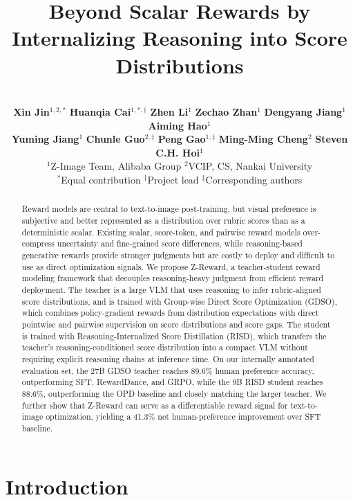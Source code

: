 \documentclass{article}
\title{
Beyond Scalar Rewards by\\Internalizing Reasoning into Score Distributions
}
\author{
\vspace{-39pt}\\
\hspace{-6mm} \textbf{Xin Jin}$^{1,2,*}$\hspace{2mm}
\textbf{Huanqia Cai}$^{1,*,\dagger}$\hspace{2mm}
\textbf{Zhen Li}$^{1}$\hspace{2mm}
\textbf{Zechao Zhan}$^{1}$\hspace{2mm}
\textbf{Dengyang Jiang}$^{1}$\hspace{2mm}
\textbf{Aiming Hao}$^{1}$\\[0.5mm]
\hspace{-6mm} \textbf{Yuming Jiang}$^{1}$\hspace{2mm}
\textbf{Chunle Guo}$^{2,\ddagger}$\hspace{2mm}
\textbf{Peng Gao}$^{1,\ddagger}$\hspace{2mm} 
\textbf{Ming-Ming Cheng}$^{2}$\hspace{2mm} 
\textbf{Steven C.H. Hoi}$^{1}$\\[1.5mm]
\hspace{-6mm} $^{1}$Z-Image Team, Alibaba Group \hspace{10mm} $^{2}$VCIP, CS, Nankai University\\[2.4mm]
\hspace{-6mm} $^{*}$Equal contribution
\hspace{10mm} $^{\dagger}$Project lead
\hspace{10mm} $^{\ddagger}$Corresponding authors
}
\newcommand{\mname}{Z-Reward\xspace}
\newcommand{\teaname}{GDSO\xspace}
\newcommand{\stuname}{RISD\xspace}
\begin{document}
\maketitle


\begin{abstract}
Reward models are central to text-to-image post-training, but visual preference is subjective and better represented as a distribution over rubric scores than as a deterministic scalar. Existing scalar, score-token, and pairwise reward models over-compress uncertainty and fine-grained score differences, while reasoning-based generative rewards provide stronger judgments but are costly to deploy and difficult to use as direct optimization signals. 
We propose \mname, a teacher-student reward modeling framework that decouples reasoning-heavy judgment from efficient reward deployment. The teacher is a large VLM that uses reasoning to infer rubric-aligned score distributions, and is trained with Group-wise Direct Score Optimization (\teaname), which combines policy-gradient rewards from distribution expectations with direct pointwise and pairwise supervision on score distributions and score gaps. The student is trained with Reasoning-Internalized Score Distillation (\stuname), which transfers the teacher's reasoning-conditioned score distribution into a compact VLM without requiring explicit reasoning chains at inference time. On our internally annotated evaluation set, the 27B \teaname teacher reaches 89.6\% human preference accuracy, outperforming SFT, RewardDance, and GRPO, while the 9B \stuname student reaches 88.6\%, outperforming the OPD baseline and closely matching the larger teacher. We further show that \mname can serve as a differentiable reward signal for text-to-image optimization, yielding a 41.3\% net human-preference improvement over SFT baseline.
\end{abstract}

\section{Introduction}
\end{document}
